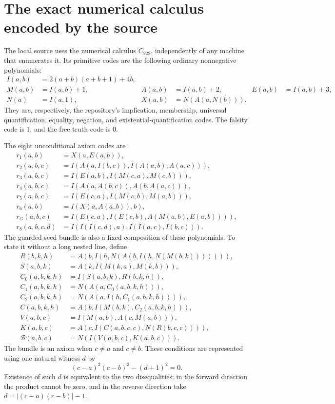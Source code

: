 \section{The exact numerical calculus encoded by the source}

The local source uses the numerical calculus $C_{222}$, independently of
any machine that enumerates it.  Its primitive codes are the following
ordinary nonnegative polynomials:
\begin{align*}
 I(a,b)&=2(a+b)(a+b+1)+4b,\\
 M(a,b)&=I(a,b)+1,& A(a,b)&=I(a,b)+2,& E(a,b)&=I(a,b)+3,\\
 N(a)&=I(a,1),& X(a,b)&=N(A(a,N(b))).
\end{align*}
They are, respectively, the repository's implication, membership,
universal quantification, equality, negation, and existential-quantification
codes.  The falsity code is $1$, and the free truth code is $0$.

The eight unconditional axiom codes are
\begin{align*}
 r_1(a,b)&=X(a,E(a,b)),\\
 r_2(a,b,c)&=I(A(a,I(b,c)),I(A(a,b),A(a,c))),\\
 r_3(a,b,c)&=I(E(a,b),I(M(c,a),M(c,b))),\\
 r_4(a,b,c)&=I(A(a,A(b,c)),A(b,A(a,c))),\\
 r_5(a,b,c)&=I(E(c,a),I(M(c,b),M(a,b))),\\
 r_6(a,b)&=I(X(a,A(a,b)),b),\\
 r_G(a,b,c)&=I(E(c,a),I(E(c,b),A(M(a,b),E(a,b)))),\\
 r_8(a,b,c,d)&=I(I(I(c,d),a),I(I(a,c),I(b,c))).
\end{align*}
The guarded seed bundle is also a fixed composition of these polynomials.
To state it without a long nested line, define
\begin{align*}
 R(b,k,h)&=A(b,I(h,N(A(b,I(h,N(M(b,k))))))),\\
 S(a,b,k)&=A(k,I(M(k,a),M(k,b))),\\
 C_0(a,b,k,h)&=I(S(a,b,k),R(b,k,h)),\\
 C_1(a,b,k,h)&=N(A(a,C_0(a,b,k,h))),\\
 C_2(a,b,k,h)&=N(A(a,I(h,C_1(a,b,k,h)))),\\
 C(a,b,k,h)&=A(b,I(M(b,k),C_2(a,b,k,h))),\\
 V(a,b,c)&=I(M(a,b),A(c,M(a,b))),\\
 K(a,b,c)&=A(c,I(C(a,b,c,c),N(R(b,c,c)))),\\
 \mathcal B(a,b,c)&=N(I(V(a,b,c),K(a,b,c))).
\end{align*}
The bundle is an axiom when $c\ne a$ and $c\ne b$.  These conditions
are represented using one natural witness $d$ by
\[
 (c-a)^2(c-b)^2-(d+1)^2=0.
\]
Existence of such $d$ is equivalent to the two disequalities: in the
forward direction the product cannot be zero, and in the reverse direction
take $d=|(c-a)(c-b)|-1$.

